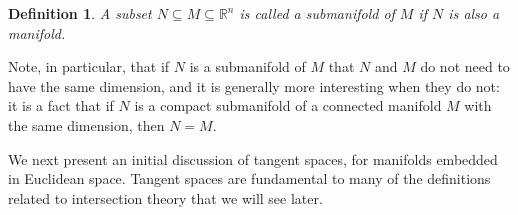 \documentclass{amsart}          %
\newtheorem{definition}[theorem]{Definition}
\newcommand{\R}{\mathbb R}
\begin{document}
\begin{definition}

	A subset $N\subseteq M\subseteq \R^n$ is called a submanifold of $M$ if $N$ is also a manifold.
\end{definition}

Note, in particular, that if $N$ is a submanifold of $M$ that $N$ and $M$ do not need to have the same dimension, and it is generally more interesting when they do not: it is a fact that if $N$ is a compact submanifold of a connected manifold $M$ with the same dimension, then $N=M$. 

We next present an initial discussion of tangent spaces, for manifolds embedded in Euclidean space. Tangent spaces are fundamental to many of the definitions related to intersection theory that we will see later.
\end{document}
